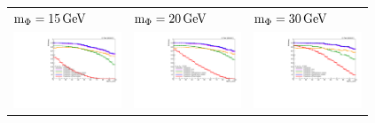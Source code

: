 \begin{figure}[htb!]
	\centering
	\begin{tabular}{>{\centering\arraybackslash}m{0.32\linewidth} >{\centering\arraybackslash}m{0.32\linewidth} >{\centering\arraybackslash}m{0.32\linewidth}}
		$\text{m}_\Phi=15\,\text{Ge\hspace{-.08em}V}$ & $\text{m}_\Phi=20\,\text{Ge\hspace{-.08em}V}$ & $\text{m}_\Phi=30\,\text{Ge\hspace{-.08em}V}$ \\
		\includegraphics[width=\linewidth]{figs/05_analysis/cutBasedID_effVsLxy_Z_m15_cats_2018.pdf} &
		\includegraphics[width=\linewidth]{figs/05_analysis/cutBasedID_effVsLxy_Z_m20_cats_2018.pdf} &
		\includegraphics[width=\linewidth]{figs/05_analysis/cutBasedID_effVsLxy_Z_m30_cats_2018.pdf} \\

\end{tabular}
\end{figure}
